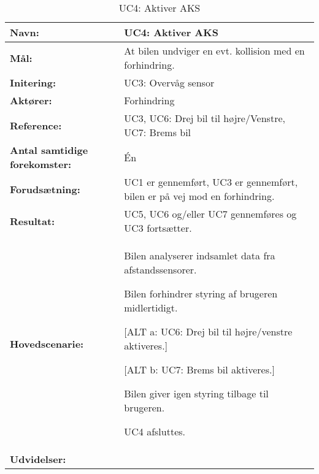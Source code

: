 \begin{table}[h]
\begin{tabularx}{\textwidth}{| L{3.3 cm} | Z |} \hline

\textbf{Navn:} 						& UC4: Aktiver AKS\\ \hline
\textbf{Mål:}						& At bilen undviger en evt. kollision med en forhindring. \\ \hline
\textbf{Initering:}					& UC3: Overvåg sensor \\ \hline
\textbf{Aktører:} 					& Forhindring \\ \hline
\textbf{Reference:} 				& UC3, UC6: Drej bil til højre/Venstre, UC7: Brems bil \\ \hline
\textbf{Antal samtidige forekomster:} & Én \\ \hline
\textbf{Forudsætning:} 				& UC1 er gennemført, UC3 er gennemført, bilen er på vej mod en forhindring. \\ \hline
\textbf{Resultat:}					& UC5, UC6 og/eller UC7 gennemføres og UC3 fortsætter. \\ \hline
\textbf{Hovedscenarie:}				& 

\begin{packed_enum}
\item Bilen analyserer indsamlet data fra afstandssensorer.
\item Bilen forhindrer styring af brugeren midlertidigt.
\item 
	\begin{packed_item}\itemsep1pt \parskip0pt 
	\item {[}ALT a: UC6: Drej bil til højre/venstre aktiveres.{]}
	\item {[}ALT b: UC7: Brems bil aktiveres.{]}
	\end{packed_item}
\item Bilen giver igen styring tilbage til brugeren.
\item UC4 afsluttes.
\end{packed_enum} \\ \hline
\textbf{Udvidelser:}				&  

\\ \hline
\end{tabularx}
\caption{UC4: Aktiver AKS}
\label{tbl:UC4}
\end{table}